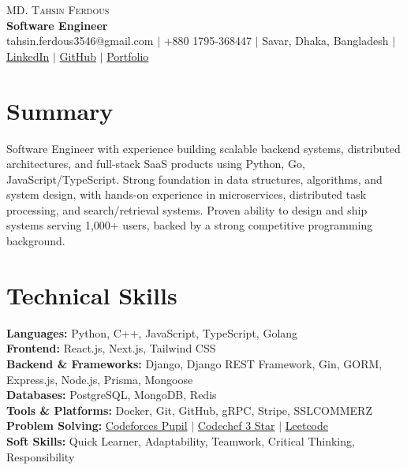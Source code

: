 \documentclass[letterpaper,10.5pt]{article}
\begin{document}
\begin{center}
    {\LARGE \scshape MD. Tahsin Ferdous} \\ \vspace{4pt}
    {\large\bfseries Software Engineer} \\ \vspace{6pt}
    \small
    tahsin.ferdous3546@gmail.com $|$
    +880 1795-368447 $|$
    Savar, Dhaka, Bangladesh $|$
    \href{https://www.linkedin.com/in/md-tahsin-ferdous/}{LinkedIn} $|$
    \href{https://github.com/tahsin005}{GitHub} $|$
    \href{https://tahsin-exe.vercel.app/}{Portfolio}
\end{center}

\section{Summary}
\small{
Software Engineer with experience building scalable backend systems, distributed architectures, and full-stack SaaS products using {Python, Go, JavaScript/TypeScript}. Strong foundation in data structures, algorithms, and system design, with hands-on experience in microservices, distributed task processing, and search/retrieval systems. Proven ability to design and ship systems serving 1,000+ users, backed by a strong competitive programming background.
}


\section{Technical Skills}
 \begin{itemize}[leftmargin=0.15in, label={}]
    \small{\item{
     \textbf{Languages:}{ Python, C++, JavaScript, TypeScript, Golang} \\[2pt]
     \textbf{Frontend:}{ React.js, Next.js, Tailwind CSS} \\[2pt]
     \textbf{Backend \& Frameworks:}{ Django, Django REST Framework, Gin, GORM, Express.js, Node.js, Prisma, Mongoose} \\[2pt]
     \textbf{Databases:}{ PostgreSQL, MongoDB, Redis} \\[2pt]
     \textbf{Tools \& Platforms:}{ Docker, Git, GitHub, gRPC, Stripe, SSLCOMMERZ} \\[2pt]
     \textbf{Problem Solving:} \href{https://codeforces.com/profile/tahsin_ferdous}{Codeforces Pupil} $|$  \href{https://www.codechef.com/users/tahsinferdous3}{Codechef 3 Star}  $|$  \href{https://leetcode.com/u/md-tahsin-ferdous/}{Leetcode} \\[2pt]
     \textbf{Soft Skills:}{ Quick Learner, Adaptability, Teamwork, Critical Thinking, Responsibility}
    }}
 \end{itemize}
\end{document}
